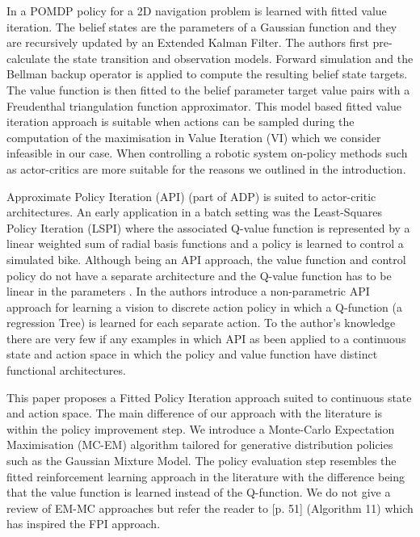 \documentclass[final,5p,times,twocolumn]{elsarticle}
\begin{document}
In \cite{PPOMDP_2006} a POMDP policy for a 2D navigation problem is learned with fitted value iteration.
The belief states are the parameters of a Gaussian function and they are recursively updated by an Extended Kalman Filter. 
The authors first pre-calculate the state transition and observation models. Forward simulation and 
the Bellman backup operator is applied to compute the resulting belief state targets.
The value function is then fitted to the belief parameter target value pairs with a Freudenthal triangulation function approximator. 
This model based fitted value iteration approach is suitable when actions can be sampled during the computation 
of the maximisation in Value Iteration (VI) which we consider infeasible in our case.
When controlling a robotic system on-policy methods such as actor-critics are more suitable for 
the reasons we outlined in the introduction.

Approximate Policy Iteration (API) \cite{Neuro_1996,Bertsekas2011} (part of ADP) is suited to actor-critic architectures.
An early application in a batch setting was the Least-Squares Policy Iteration (LSPI) \cite{LSPI_2003} where the associated 
Q-value function is represented by a linear weighted sum of radial basis functions and a policy is learned to control 
a simulated bike. Although being an API approach, the value function and control policy do not have a separate 
architecture and the Q-value function has to be linear in the parameters \cite{Sutton00policygradient}. In 
\cite{Jodogne2006} the authors introduce a non-parametric API approach for learning a vision to discrete action policy in which 
a Q-function (a regression Tree) is learned for each separate action. To the author's knowledge there are very 
few if any examples in which API as been applied to a continuous state and action space in which the policy and value function 
have distinct functional architectures. 

This paper proposes a Fitted Policy Iteration approach suited to continuous state and action space. The main difference of our approach 
with the literature is within the policy improvement step. We introduce a Monte-Carlo Expectation Maximisation (MC-EM) 
algorithm tailored for generative distribution policies such as the Gaussian Mixture Model. The policy evaluation step resembles the 
fitted reinforcement learning approach in the literature with the difference being that the value function is learned instead of the Q-function.
We do not give a review of EM-MC approaches but refer the reader to \cite{rl_gradient_survey_2013}[p. 51] (Algorithm 11) which has 
inspired the FPI approach.
\end{document}
